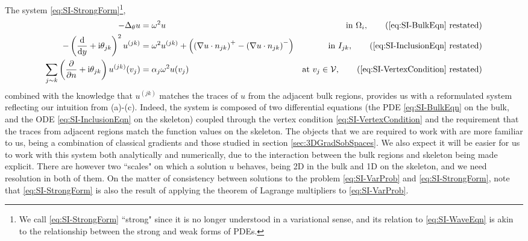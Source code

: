 The system \eqref{eq:SI-StrongForm}\footnote{We call \eqref{eq:SI-StrongForm} ``strong" since it is no longer understood in a variational sense, and its relation to \eqref{eq:SI-WaveEqn} is akin to the relationship between the strong and weak forms of PDEs.}, 
\begin{subequations}
	\begin{align*}
		-\laplacian_\qm u 
		&= \omega^2 u 
		&\text{in } \ddom_i, \tag{\eqref{eq:SI-BulkEqn} restated} \\
		- \bracs{\diff{}{y} + \rmi\qm_{jk}}^2u^{(jk)}  
		&= \omega^2 u^{(jk)} + \bracs{\bracs{\grad u\cdot n_{jk}}^+ - \bracs{\grad u\cdot n_{jk}}^-}
		&\text{in } I_{jk}, \tag{\eqref{eq:SI-InclusionEqn} restated} \\
		\sum_{j\con k} \bracs{\pdiff{}{n}+\rmi\qm_{jk}} u^{(jk)}(v_j) 
		&= \alpha_j\omega^2 u(v_j)
		&\text{at } v_j\in\vertSet, \tag{\eqref{eq:SI-VertexCondition} restated}
	\end{align*}
\end{subequations}
combined with the knowledge that $u^{(jk)}$ matches the traces of $u$ from the adjacent bulk regions, provides us with a reformulated system reflecting our intuition from (a)-(c).
Indeed, the system is composed of two differential equations (the PDE \eqref{eq:SI-BulkEqn} on the bulk, and the ODE \eqref{eq:SI-InclusionEqn} on the skeleton) coupled through the vertex condition \eqref{eq:SI-VertexCondition} and the requirement that the traces from adjacent regions match the function values on the skeleton.
The objects that we are required to work with are more familiar to us, being a combination of classical gradients and those studied in section \ref{sec:3DGradSobSpaces}. 
We also expect it will be easier for us to work with this system both analytically and numerically, due to the interaction between the bulk regions and skeleton being made explicit.
There are however two ``scales" on which a solution $u$ behaves, being 2D in the bulk and 1D on the skeleton, and we need resolution in both of them.
On the matter of consistency between solutions to the problem \eqref{eq:SI-VarProb} and \eqref{eq:SI-StrongForm}, note that \eqref{eq:SI-StrongForm} is also the result of applying the theorem of Lagrange multipliers to \eqref{eq:SI-VarProb}.

